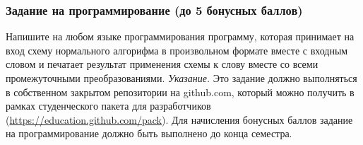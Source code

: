 \documentclass[12pt,a4paper]{article}
\begin{document}
\subsubsection*{Задание на программирование (до 5 бонусных баллов)}

 Напишите на любом языке программирования программу, которая принимает на вход схему нормального алгорифма в произвольном формате вместе с входным словом и печатает результат применения схемы к слову вместе со всеми промежуточными преобразованиями. \emph{Указание.} Это задание должно выполняться в собственном закрытом репозитории на github.com, который можно получить в рамках студенческого пакета для разработчиков (\url{https://education.github.com/pack}). Для начисления бонусных баллов задание на программирование должно быть выполнено до конца семестра.
\end{document}
